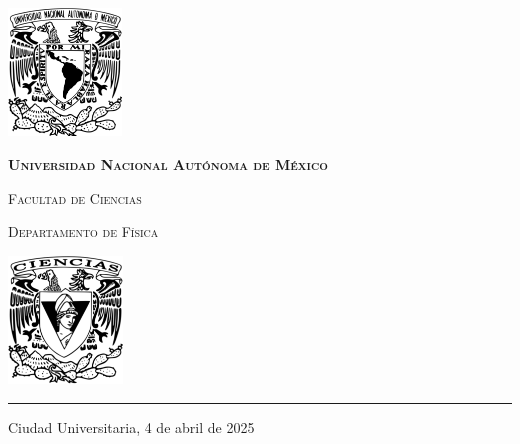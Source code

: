 \documentclass[9pt,letterpaper]{article}
\begin{document}
	
	
	\begin{center}
		\begin{minipage}{3cm}
			\begin{center}
				\includegraphics[height=3.4cm]{../Figuras/Logo_UNAM (1)}
			\end{center}
		\end{minipage}\hfill
		\begin{minipage}{10cm}
			\begin{center}
				{\scshape\LARGE \textbf{Universidad Nacional Autónoma de México} \par}
				{\scshape\Large Facultad de Ciencias\par}
				{\scshape\Large Departamento de Física\par}
			\end{center}
		\end{minipage}\hfill
		\begin{minipage}{3cm}
			\begin{center}
				\includegraphics[height=3.4cm]{../Figuras/Logo_FC (1)}
			\end{center}
		\end{minipage}
	\end{center}
	
	\rule{17cm}{0.1mm}
	
	\hspace{0.5cm}
	
	\parbox{\textwidth}{\raggedleft Ciudad Universitaria, 4 de abril de 2025}
	
		\hspace{1cm}
	
		\vspace{0.5cm}
	 
\end{document}
